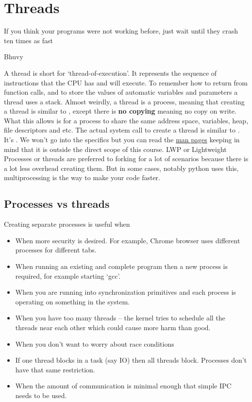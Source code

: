 \chapter{Threads}

\epigraph{If you think your programs were not working before, just wait until they crash ten times as fast}{Bhuvy}

A thread is short for `thread-of-execution'.
It represents the sequence of instructions that the CPU has and will execute.
To remember how to return from function calls, and to store the values of automatic variables and parameters a thread uses a stack.
Almost weirdly, a thread is a process, meaning that creating a thread is similar to , except there is \textbf{no copying} meaning no copy on write.
What this allows is for a process to share the same address space, variables, heap, file descriptors and etc.
The actual system call to create a thread is similar to . It's .
We won't go into the specifics but you can read the \href{http://man7.org/linux/man-pages/man2/clone.2.html}{man pages} keeping in mind that it is outside the direct scope of this course.
LWP or Lightweight Processes or threads are preferred to forking for a lot of scenarios because there is a lot less overhead creating them.
But in some cases, notably python uses this, multiprocessing is the way to make your code faster.

\section{Processes vs threads}

Creating separate processes is useful when

\begin{itemize}
\item When more security is desired. For example, Chrome browser uses different processes for different tabs.
\item When running an existing and complete program then a new process is required, for example starting `gcc'.
\item When you are running into synchronization primitives and each process is operating on something in the system.
\item When you have too many threads -- the kernel tries to schedule all the threads near each other which could cause more harm than good.
\item When you don't want to worry about race conditions
\item If one thread blocks in a task (say IO) then all threads block. Processes don't have that same restriction.
\item When the amount of communication is minimal enough that simple IPC needs to be used.
\end{itemize}

